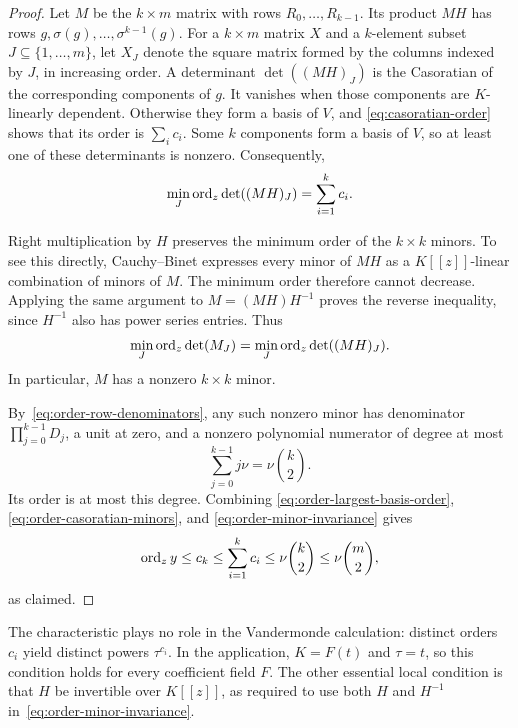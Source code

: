 \begin{proof}
Let $M$ be the $k\times m$ matrix with rows $R_0,\ldots,R_{k-1}$.
Its product $MH$ has rows $g,\sigma(g),\ldots,\sigma^{k-1}(g)$.
For a $k\times m$ matrix $X$ and a $k$-element subset
$J\subseteq\{1,\ldots,m\}$, let $X_J$ denote the square matrix formed
by the columns indexed by $J$, in increasing order.  A determinant
$\det((MH)_J)$ is the Casoratian of the corresponding components of
$g$.  It vanishes when those components are $K$-linearly dependent.
Otherwise they form a basis of $V$, and
\eqref{eq:casoratian-order} shows that its order is $\sum_i c_i$.
Some $k$ components form a basis of $V$, so at least one of these
determinants is nonzero.  Consequently,
\begin{equation}\label{eq:order-casoratian-minors}
  \min_J\operatorname{ord}_z\det((MH)_J)=\sum_{i=1}^k c_i.
\end{equation}

Right multiplication by $H$ preserves the minimum order of the
$k\times k$ minors.  To see this directly, Cauchy--Binet expresses every
minor of $MH$ as a $K[[z]]$-linear combination of minors of $M$.
The minimum order therefore cannot decrease.  Applying the same
argument to $M=(MH)H^{-1}$ proves the reverse inequality, since
$H^{-1}$ also has power series entries.  Thus
\begin{equation}\label{eq:order-minor-invariance}
  \min_J\operatorname{ord}_z\det(M_J)
  =\min_J\operatorname{ord}_z\det((MH)_J).
\end{equation}
In particular, $M$ has a nonzero $k\times k$ minor.

By~\eqref{eq:order-row-denominators}, any such nonzero minor has
denominator $\prod_{j=0}^{k-1}D_j$, a unit at zero, and a nonzero
polynomial numerator of degree at most
\[
  \sum_{j=0}^{k-1}j\nu=\nu\binom{k}{2}.
\]
Its order is at most this degree.  Combining
\eqref{eq:order-largest-basis-order},
\eqref{eq:order-casoratian-minors}, and
\eqref{eq:order-minor-invariance} gives
\[
  \operatorname{ord}_z y
  \leq c_k
  \leq\sum_{i=1}^k c_i
  \leq\nu\binom{k}{2}
  \leq\nu\binom{m}{2},
\]
as claimed.
\end{proof}

The characteristic plays no role in the Vandermonde calculation:
distinct orders $c_i$ yield distinct powers $\tau^{c_i}$.  In the
application, $K=F(t)$ and $\tau=t$, so this condition holds for every
coefficient field $F$.  The other essential local condition is that
$H$ be invertible over $K[[z]]$, as required to use both $H$ and
$H^{-1}$ in~\eqref{eq:order-minor-invariance}.
